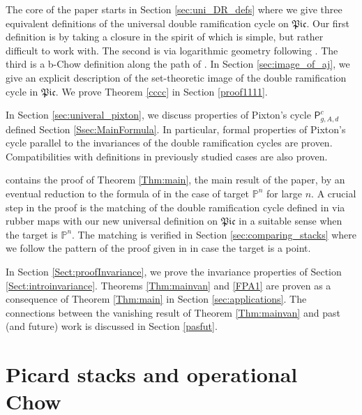\documentclass[a4paper,12pt]{article} %
\newcommand{\bb}[1]{{\mathbb{#1}}}
\def\P{\mathsf{P}}
\theoremstyle{definition}
\theoremstyle{plain}%
\newcommand{\Picabs}{\mathfrak{Pic}}
\begin{document}
The core  of the
paper starts in Section \ref{sec:uni_DR_defs} where
we give three equivalent definitions of the universal double ramification cycle on $\Picabs$. Our first definition is by taking a closure in the spirit of \cite{Holmes2017Jacobian-extens}
which is simple, but rather difficult to work with. The second is via logarithmic geometry following \cite{Marcus2017Logarithmic-com}. The third is a  b-Chow definition along the path of
\cite{Holmes2017Multiplicativit}. 
In  Section \ref{sec:image_of_aj}, we give an explicit description of the 
set-theoretic image of the double ramification cycle in $\Picabs$.
We prove Theorem \ref{cccc} in Section \ref{proof1111}.

In Section \ref{sec:univeral_pixton}, we discuss properties 
of Pixton's  cycle $\P_{g,A,d}^{c}$ defined  Section \ref{Ssec:MainFormula}. In particular, 
formal properties of Pixton's cycle parallel to the invariances of the double ramification cycles
are proven. Compatibilities with definitions in previously studied
cases are also proven.


 contains the proof of Theorem \ref{Thm:main}, the main
result of the paper, by an eventual
reduction to the formula of \cite{Janda2018Double-ramifica} in the case of target $\bb P^n$ for large $n$.  
A crucial step in the proof is the matching of the double ramification cycle defined in \cite{Janda2018Double-ramifica} via rubber maps with
 our new universal definition on $\Picabs$ in a suitable sense when the target is $\bb P^n$. 
 The matching is verified in Section \ref{sec:comparing_stacks} where we follow the pattern of the proof given in \cite{Marcus2017Logarithmic-com} in case the target is a point. 

In Section \ref{Sect:proofInvariance}, we prove the  invariance properties of
Section \ref{Sect:introinvariance}. Theorems \ref{Thm:mainvan} and \ref{FPA1} are
proven as a consequence of Theorem \ref{Thm:main} in Section
 \ref{sec:applications}. The connections between the vanishing result of
 Theorem \ref{Thm:mainvan} and past (and future) work is discussed in Section \ref{pasfut}.
 




\section{Picard stacks and operational Chow}\label{sec:pic_and_chow}
\end{document}
